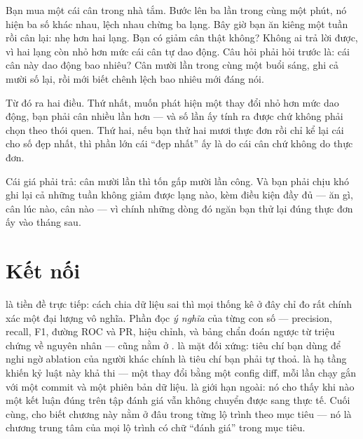 \documentclass[../../deep_learning.tex]{subfiles}
\begin{document}
\begin{dongian}
Bạn mua một cái cân trong nhà tắm. Bước lên ba lần trong cùng một phút, nó hiện ba số khác nhau, lệch nhau chừng ba lạng. Bây giờ bạn ăn kiêng một tuần rồi cân lại: nhẹ hơn hai lạng. Bạn có giảm cân thật không? Không ai trả lời được, vì hai lạng còn nhỏ hơn mức cái cân tự dao động. Câu hỏi phải hỏi trước là: cái cân này dao động bao nhiêu? Cân mười lần trong cùng một buổi sáng, ghi cả mười số lại, rồi mới biết chênh lệch bao nhiêu mới đáng nói.

Từ đó ra hai điều. Thứ nhất, muốn phát hiện một thay đổi nhỏ hơn mức dao động, bạn phải cân nhiều lần hơn --- và số lần ấy tính ra được chứ không phải chọn theo thói quen. Thứ hai, nếu bạn thử hai mươi thực đơn rồi chỉ kể lại cái cho số đẹp nhất, thì phần lớn cái ``đẹp nhất'' ấy là do cái cân chứ không do thực đơn.

Cái giá phải trả: cân mười lần thì tốn gấp mười lần công. Và bạn phải chịu khó ghi lại cả những tuần không giảm được lạng nào, kèm điều kiện đầy đủ --- ăn gì, cân lúc nào, cân nào --- vì chính những dòng đó ngăn bạn thử lại đúng thực đơn ấy vào tháng sau.

\end{dongian}

\section{Kết nối}
 là tiền đề trực tiếp: cách chia dữ liệu sai thì mọi thống kê ở đây chỉ đo rất chính xác một đại lượng vô nghĩa. Phần đọc \emph{ý nghĩa} của từng con số --- precision, recall, F1, đường ROC và PR, hiệu chỉnh, và bảng chẩn đoán ngược từ triệu chứng về nguyên nhân --- cũng nằm ở .  là mặt đối xứng: tiêu chí bạn dùng để nghi ngờ ablation của người khác chính là tiêu chí bạn phải tự thoả.  là hạ tầng khiến kỷ luật này khả thi — một thay đổi bằng một config diff, mỗi lần chạy gắn với một commit và một phiên bản dữ liệu.  là giới hạn ngoài: nó cho thấy khi nào một kết luận đúng trên tập đánh giá vẫn không chuyển được sang thực tế. Cuối cùng,  cho biết chương này nằm ở đâu trong từng lộ trình theo mục tiêu --- nó là chương trung tâm của mọi lộ trình có chữ ``đánh giá'' trong mục tiêu.
\end{document}
